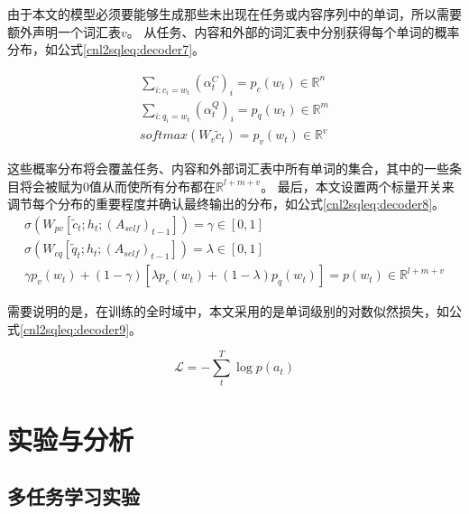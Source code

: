 由于本文的模型必须要能够生成那些未出现在任务或内容序列中的单词，所以需要额外声明一个词汇表$v$。
从任务、内容和外部的词汇表中分别获得每个单词的概率分布，如公式\ref{cnl2sqleq:decoder7}。

\begin{gather}
  \label{cnl2sqleq:decoder7}
  \sum_{i:c_i=w_t} (\alpha^C_t)_i = p_c(w_t) \in \mathbb{R}^{n}\\
  \sum_{i:q_i=w_t} (\alpha^Q_t)_i = p_q(w_t) \in \mathbb{R}^{m}\\
  softmax(W_v\widetilde{c}_t) = p_v(w_t) \in \mathbb{R}^{v}
\end{gather}

这些概率分布将会覆盖任务、内容和外部词汇表中所有单词的集合，其中的一些条目将会被赋为0值从而使所有分布都在$\mathbb{R}^{l+m+v}$。
最后，本文设置两个标量开关来调节每个分布的重要程度并确认最终输出的分布，如公式\ref{cnl2sqleq:decoder8}。
\begin{gather}
  \label{cnl2sqleq:decoder8}
  \sigma (W_{pv}[\widetilde{c}_t;h_t;(A_{self})_{t-1}]) = \gamma \in [0,1]\\
  \sigma (W_{cq}[\widetilde{q}_t;h_t;(A_{self})_{t-1}]) = \lambda \in [0,1]\\
  \gamma p_v(w_t) + (1 - \gamma)[\lambda p_c(w_t) + (1 - \lambda)p_q(w_t)] = p(w_t) \in \mathbb{R}^{l+m+v}
\end{gather}

需要说明的是，在训练的全时域中，本文采用的是单词级别的对数似然损失，如公式\ref{cnl2sqleq:decoder9}。

\begin{equation}
  \label{cnl2sqleq:decoder9}
  \mathcal L = -\sum^T_t \log p(a_t)
\end{equation}


\section{实验与分析}
\label{cnl2sql:syyfx}
\subsection{多任务学习实验}

